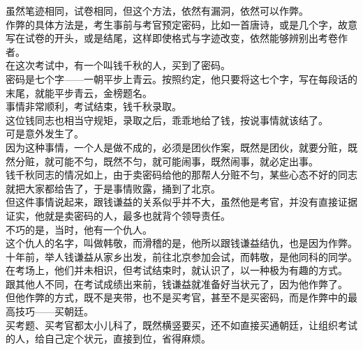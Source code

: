 \begin{multicols}{\theparacolNo}
虽然笔迹相同，试卷相同，但这个方法，依然有漏洞，依然可以作弊。\\

作弊的具体方法是，考生事前与考官预定密码，比如一首唐诗，或是几个字，故意写在试卷的开头，或是结尾，这样即使格式与字迹改变，依然能够辨别出考卷作者。\\

在这次考试中，有一个叫钱千秋的人，买到了密码。\\

密码是七个字——一朝平步上青云。按照约定，他只要将这七个字，写在每段话的末尾，就能平步青云，金榜题名。\\

事情非常顺利，考试结束，钱千秋录取。\\

这位钱同志也相当守规矩，录取之后，乖乖地给了钱，按说事情就该结了。\\

可是意外发生了。\\

因为这种事情，一个人是做不成的，必须是团伙作案，既然是团伙，就要分赃，既然分赃，就可能不匀，既然不匀，就可能闹事，既然闹事，就必定出事。\\

钱千秋同志的情况如上，由于卖密码给他的那帮人分赃不匀，某些心态不好的同志就把大家都给告了，于是事情败露，捅到了北京。\\

但这件事情说起来，跟钱谦益的关系似乎并不大，虽然他是考官，并没有直接证据证实，他就是卖密码的人，最多也就背个领导责任。\\

不巧的是，当时，他有一个仇人。\\

这个仇人的名字，叫做韩敬，而滑稽的是，他所以跟钱谦益结仇，也是因为作弊。\\

十年前，举人钱谦益从家乡出发，前往北京参加会试，而韩敬，是他同科的同学。\\

在考场上，他们并未相识，但考试结束时，就认识了，以一种极为有趣的方式。\\

跟其他人不同，在考试成绩出来前，钱谦益就准备好当状元了，因为他作弊了。\\

但他作弊的方式，既不是夹带，也不是买考官，甚至不是买密码，而是作弊中的最高技巧——买朝廷。\\

买考题、买考官都太小儿科了，既然横竖要买，还不如直接买通朝廷，让组织考试的人，给自己定个状元，直接到位，省得麻烦。\\


\end{multicols}
